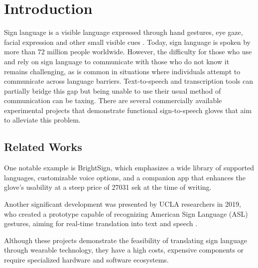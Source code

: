 \section{Introduction}
\label{section:intro}
Sign language is a visible language expressed through hand gestures, eye gaze, facial expression and other small visible cues \cite{Sign_lang}. Today, sign language is spoken by more than 72 million people worldwide. However, the difficulty for those who use and rely on sign language to communicate with those who do not know it remains challenging, as is common in situations where individuals attempt to communicate across language barriers. Text-to-speech and transcription tools can partially bridge this gap but being unable to use their usual method of communication can be taxing. There are several commercially available experimental projects that demonstrate functional sign-to-speech gloves that aim to alleviate this problem.

\subsection{Related Works}
One notable example is BrightSign, which emphasizes a wide library of supported languages, customizable voice options, and a companion app that enhances the glove's usability at a steep price of 27031 sek at the time of writing\cite{bright}.

Another significant development was presented by UCLA researchers in 2019, who created a prototype capable of recognizing American Sign Language (ASL) gestures, aiming for real-time translation into text and speech \cite{UCLA}.

Although these projects demonstrate the feasibility of translating sign language through wearable technology, they have a high costs, expensive components or require specialized hardware and software ecosystems.